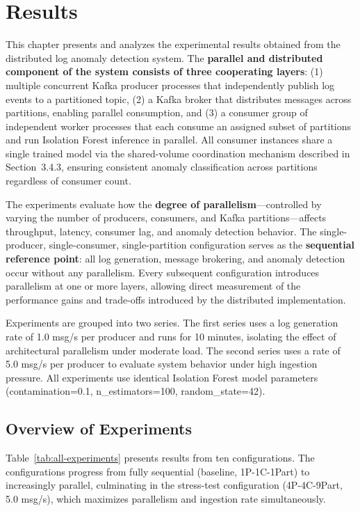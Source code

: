 \documentclass[12pt,a4paper]{report}
\begin{document}
\chapter{Results}

This chapter presents and analyzes the experimental results obtained from the distributed
log anomaly detection system. The \textbf{parallel and distributed component of the system
consists of three cooperating layers}: (1) multiple concurrent Kafka producer processes that
independently publish log events to a partitioned topic, (2) a Kafka broker that distributes
messages across partitions, enabling parallel consumption, and (3) a consumer group of
independent worker processes that each consume an assigned subset of partitions and run
Isolation Forest inference in parallel. All consumer instances share a single trained model
via the shared-volume coordination mechanism described in Section~3.4.3, ensuring
consistent anomaly classification across partitions regardless of consumer count.

The experiments evaluate how the \textbf{degree of parallelism}---controlled by varying the
number of producers, consumers, and Kafka partitions---affects throughput, latency, consumer
lag, and anomaly detection behavior. The single-producer, single-consumer, single-partition
configuration serves as the \textbf{sequential reference point}: all log generation, message
brokering, and anomaly detection occur without any parallelism. Every subsequent
configuration introduces parallelism at one or more layers, allowing direct measurement of
the performance gains and trade-offs introduced by the distributed implementation.

Experiments are grouped into two series. The first series uses a log generation rate of
1.0 msg/s per producer and runs for 10 minutes, isolating the effect of architectural
parallelism under moderate load. The second series uses a rate of 5.0 msg/s per producer
to evaluate system behavior under high ingestion pressure. All experiments use identical
Isolation Forest model parameters (contamination=0.1, n\_estimators=100, random\_state=42).

\section{Overview of Experiments}

Table~\ref{tab:all-experiments} presents results from ten configurations. The
configurations progress from fully sequential (baseline, 1P-1C-1Part) to increasingly
parallel, culminating in the stress-test configuration (4P-4C-9Part, 5.0 msg/s), which
maximizes parallelism and ingestion rate simultaneously.
\end{document}
